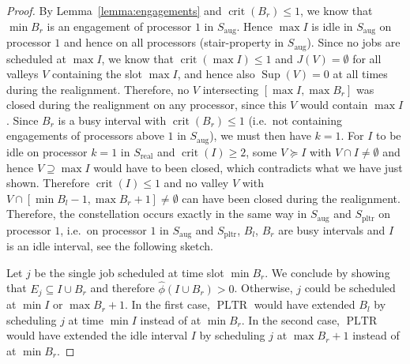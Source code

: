\documentclass[a4paper]{article}
\DeclareMathOperator{\pltr}{pltr}
\DeclareMathOperator{\PLTR}{PLTR}
\DeclareMathOperator{\aug}{aug}
\DeclareMathOperator{\real}{real}
\DeclareMathOperator{\crit}{crit}
\DeclareMathOperator{\res}{Sup}
\begin{document}
\begin{proof}
  By Lemma~\ref{lemma:engagements} and $\crit(B_r) \leq 1$, we know that $\min B_r$ is an engagement of processor $1$ in $S_{\aug}$.
  Hence $\max I$ is idle in $S_{\aug}$ on processor $1$ and hence on all processors (stair-property in $S_{\aug}$).
  Since no jobs are scheduled at $\max I$, we know that $\crit(\max I) \leq 1$ and $J(V) = \emptyset$ for all valleys $V$ containing the slot $\max I$, and hence also $\res(V) = 0$ at all times during the realignment.
  Therefore, no $V$ intersecting $[\max I, \max B_r]$ was closed during the realignment on any processor, since this $V$ would contain $\max I$.
  Since $B_r$ is a busy interval with $\crit(B_r) \leq 1$ (i.e.\ not containing engagements of processors above $1$ in $S_{\aug}$), we must then have $k = 1$.
  For $I$ to be idle on processor $k = 1$ in $S_{\real}$ and $\crit(I) \geq 2$, some $V \succeq I$ with $V \cap I \neq \emptyset$ and hence $V \supseteq \max I$ would have to been closed, which contradicts what we have just shown.
  Therefore $\crit(I) \leq 1$ and no valley $V$ with $V \cap [\min B_l - 1, \max B_r + 1] \neq \emptyset$ can have been closed during the realignment.
  Therefore, the constellation occurs exactly in the same way in $S_{\aug}$ and $S_{\pltr}$ on processor $1$, i.e.\ on processor $1$ in $S_{\aug}$ and $S_{\pltr}$, $B_l$, $B_r$ are busy intervals and $I$ is an idle interval, see the following sketch.

  Let $j$ be the single job scheduled at time slot $\min B_r$.
  We conclude by showing that $E_j \subseteq I \cup B_r$ and therefore $\hat \phi(I \cup B_r) > 0$.
  Otherwise, $j$ could be scheduled at $\min I$ or $\max B_r + 1$.
  In the first case, $\PLTR$ would have extended $B_l$ by scheduling $j$ at time $\min I$ instead of at $\min B_r$.
  In the second case, $\PLTR$ would have extended the idle interval $I$ by scheduling $j$ at $\max B_r + 1$ instead of at $\min B_r$.
\end{proof}
\end{document}

